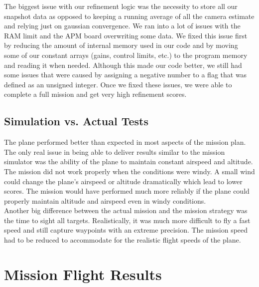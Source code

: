 \documentclass[11pt]{article}
\begin{document}
The biggest issue with our refinement logic was the necessity to store all our snapshot data as opposed to keeping a running average of all the camera estimate and relying just on gaussian convergence. We ran into a lot of issues with the RAM limit and the APM board overwriting some data. We fixed this issue first by reducing the amount of internal memory used in our code and by moving some of our constant arrays (gains, control limits, etc.) to the program memory and reading it when needed. Although this made our code better, we still had some issues that were caused by assigning a negative number to a flag that was defined as an unsigned integer. Once we fixed these issues, we were able to complete a full mission and get very high refinement scores. \\


\subsection{Simulation vs. Actual Tests}
\label{simvsact}
The plane performed better than expected in most aspects of the mission plan. The only real issue in being able to deliver results similar to the mission simulator was the ability of the plane to maintain constant airspeed and altitude. The mission did not work properly when the conditions were windy. A small wind could change the plane's airspeed or altitude dramatically which lead to lower scores. The mission would have performed much more reliably if the plane could properly maintain altitude and airspeed even in windy conditions.\\

Another big difference between the actual mission and the mission strategy was the time to sight all targets. Realistically, it was much more difficult to fly a fast speed and still capture waypoints with an extreme precision. The mission speed had to be reduced to accommodate for the realistic flight speeds of the plane.



\section{Mission Flight Results}
	\label{MissionFlightResults}
\end{document}
